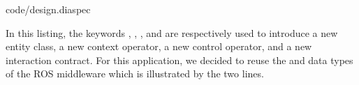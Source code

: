 %
{code/design.diaspec}

In this listing, the keywords , ,
, and  are respectively used to introduce
a new entity class, a new context operator, a new control operator,
and a new interaction contract. For this application, we decided to
reuse the  and  data types of the ROS middleware
which is illustrated by the two  lines.


